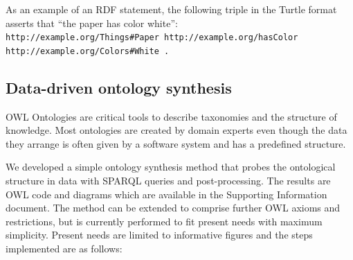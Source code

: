 \documentclass[review]{elsarticle}
\begin{document}
As an example of an RDF statement, the following triple in the Turtle
format asserts that ``the paper has color white'':\\
\texttt{http://example.org/Things\#Paper http://example.org/hasColor\\
http://example.org/Colors\#White .}

\subsection{Data-driven ontology synthesis}
OWL Ontologies are critical tools to describe taxonomies and the
structure of knowledge.
Most ontologies are created by domain experts even though the data they
arrange is often given by a software system and has a predefined
structure.  

We developed a simple ontology synthesis method that probes
the ontological structure in data with
SPARQL queries and post-processing.
The results are OWL code and diagrams which are available in the
Supporting Information document.
The method can be extended to comprise further OWL axioms and restrictions,
but is currently performed to fit present needs with maximum simplicity.
Present needs are limited to informative figures and
the steps implemented are as follows:
\end{document}
